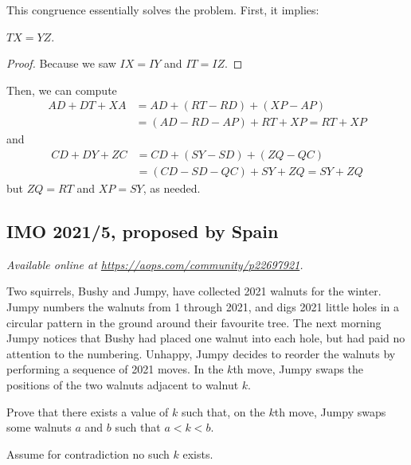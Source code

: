 \documentclass[11pt]{scrartcl}
\begin{document}
This congruence essentially solves the problem.
First, it implies:
\begin{claim*}
  $TX = YZ$.
\end{claim*}
\begin{proof}
  Because we saw $IX = IY$ and $IT = IZ$.
\end{proof}
Then, we can compute
\begin{align*}
  AD + DT + XA
  &= AD + (RT - RD) + (XP-AP) \\
  &= (AD-RD-AP) + RT + XP = RT + XP
\end{align*}
and
\begin{align*}
  CD + DY + ZC &= CD + (SY-SD) + (ZQ-QC) \\
  &= (CD-SD-QC) + SY + ZQ = SY + ZQ
\end{align*}
but $ZQ = RT$ and $XP = SY$, as needed.
\pagebreak

\subsection{IMO 2021/5, proposed by Spain}
\textsl{Available online at \url{https://aops.com/community/p22697921}.}
\begin{mdframed}[style=mdpurplebox,frametitle={Problem statement}]
Two squirrels, Bushy and Jumpy, have collected 2021 walnuts for the winter.
Jumpy numbers the walnuts from 1 through 2021, and digs 2021 little holes
in a circular pattern in the ground around their favourite tree.
The next morning Jumpy notices that Bushy had placed one walnut into each hole,
but had paid no attention to the numbering.
Unhappy, Jumpy decides to reorder the walnuts by performing a sequence of 2021 moves.
In the $k$th move, Jumpy swaps the positions of the two walnuts adjacent to walnut $k$.

Prove that there exists a value of $k$ such that, on the $k$th move,
Jumpy swaps some walnuts $a$ and $b$ such that $a<k<b$.
\end{mdframed}
Assume for contradiction no such $k$ exists.
\end{document}
